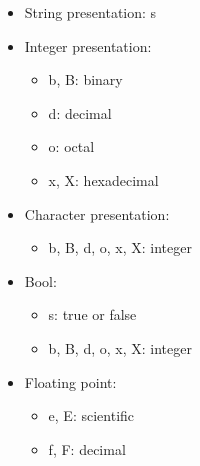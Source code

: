 \begin{itemize}
\item 
String presentation: s

\item 
Integer presentation:

\begin{itemize}
\item 
b, B: binary

\item
d: decimal 

\item 
o: octal

\item 
x, X: hexadecimal
\end{itemize}

\item 
Character presentation:

\begin{itemize}
\item 
b, B, d, o, x, X: integer
\end{itemize}

\item 
Bool:

\begin{itemize}
\item 
s: true or false

\item 
b, B, d, o, x, X: integer
\end{itemize}

\item 
Floating point:

\begin{itemize}
\item 
e, E: scientific

\item 
f, F: decimal
\end{itemize}

\end{itemize}









































